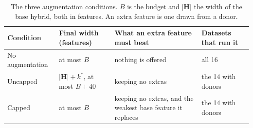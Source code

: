 \begin{table}[htbp]
\centering
\small
\caption{The three augmentation conditions. $B$ is the budget and $|\mathbf{H}|$ the width of the base hybrid, both in features. An extra feature is one drawn from a donor.}
\label{tab:aug_conditions}
\begin{tabular}{@{}p{2.4cm}p{3.0cm}p{4.6cm}p{3.6cm}@{}}
\toprule
Condition & Final width (features) & What an extra feature must beat & Datasets that run it \\
\midrule
No augmentation & at most $B$ & nothing is offered & all 16 \\
Uncapped & $|\mathbf{H}| + k^*$, at most $B + 40$ & keeping no extras & the 14 with donors \\
Capped & at most $B$ & keeping no extras, and the weakest base feature it replaces & the 14 with donors \\
\bottomrule
\end{tabular}
\end{table}


